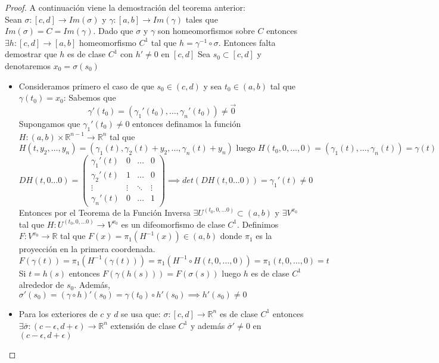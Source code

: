 \begin{proof}
    A continuación viene la demostración del teorema anterior: \\
    Sean $\sigma: [c,d] \to Im(\sigma)$ y $\gamma: [a,b] \to Im(\gamma)$ tales que $Im(\sigma) = C = Im(\gamma)$.
    Dado que $\sigma$ y $\gamma$ son homeomorfismos sobre $C$ entonces $\exists h: [c,d] \to [a,b]$ homeomorfismo $C^1$ tal que $h = \gamma^{-1} \circ \sigma$.
    Entonces falta demostrar que $h$ es de clase $C^1$ con $h' \neq 0$ en $[c,d]$
    Sea $s_0 \subset [c,d]$ y denotaremos $x_0 = \sigma(s_0)$
    \begin{itemize}
        \item     Consideramos primero el caso de que $s_0 \in (c,d)$ y sea $t_0 \in (a, b)$ tal
              que $\gamma(t_0) = x_0$: Sabemos que $$\gamma'(t_0) = (\gamma_1'(t_0), \ldots,
                  \gamma_n'(t_0)) \neq \vec{0}$$ Supongamos que $\gamma_1'(t_0) \neq 0$ entonces
              definamos la función $H: (a, b) \times \mathbb{R}^{n-1} \to \mathbb{R}^{n}$ tal que
               $$H(t, y_2, \ldots, y_n) = (\gamma_1(t), \gamma_2(t) + y_2, \ldots,
                  \gamma_n(t) + y_n) \text{ luego } H(t_0, 0, \ldots, 0) = (\gamma_1(t), \ldots,
                  \gamma_n(t)) = \gamma(t)$$ $$DH(t, 0 \ldots 0) = \begin{pmatrix}
                      \gamma_1'(t) & 0      & \ldots & 0      \\
                      \gamma_2'(t) & 1      & \ldots & 0      \\
                      \vdots       & \vdots & \ddots & \vdots \\
                      \gamma_n'(t) & 0      & \ldots & 1
                  \end{pmatrix} \implies det(DH(t, 0 \ldots 0)) = \gamma_1'(t) \neq 0$$
              Entonces por el Teorema de la Función Inversa $\exists U^{(t_0, 0, \ldots 0)} \subset (a, b)$ y $\exists V^{x_0}$ tal que $H: U^{(t_0, 0, \ldots 0)} \to V^{x_0}$ es un difeomorfismo de clase $C^1$. Definimos $F: V^{x_0} \to \mathbb{R}$ tal que $F(x) = \pi_1(H^{-1}(x)) \in (a,b)$ donde $\pi_1$ es la proyección en la primera coordenada. \\
              $$F(\gamma(t)) = \pi_1(H^{-1}(\gamma(t))) = \pi_1(H^{-1} \circ H(t, 0, \ldots, 0)) = \pi_1(t, 0, \ldots, 0) = t$$
              Si $t = h(s)$ entonces $F(\gamma(h(s))) = F(\sigma(s))$ luego $h$ es de clase $C^1$ alrededor de $s_0$. Además, $\sigma'(s_0) = (\gamma \circ h)'(s_0) = \gamma(t_0) \circ h'(s_0) \implies h'(s_0) \neq 0$ \\
        \item Para los exteriores de $c$ y $d$ se usa que: $\sigma: [c,d] \to \mathbb{R}^n$
              es de clase $C^1$ entonces $\exists \bar{\sigma}: (c - \epsilon, d + \epsilon)
                  \to \mathbb{R}^n$ extensión de clase $C^1$ y además $\bar{\sigma}' \neq 0$ en
              $(c - \epsilon, d + \epsilon)$
    \end{itemize}
\end{proof}

